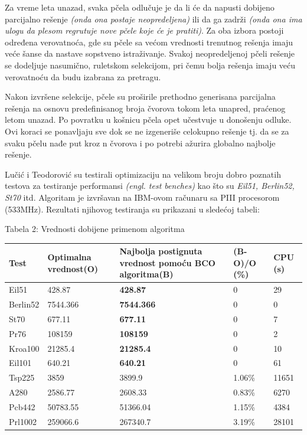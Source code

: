 \documentclass[a4paper]{article}
\begin{document}
{Za vreme leta unazad, svaka pčela odlučuje je da li će da napusti dobijeno parcijalno rešenje {\em{(onda ona postaje neopredeljena)}} ili da ga zadrži {\em{(onda ona ima ulogu da plesom regrutuje nove pčele koje će je pratiti)}}. Za oba izbora postoji određena verovatnoća, gde su pčele sa većom vrednosti trenutnog rešenja imaju veće šanse da nastave sopstveno istraživanje. Svakoj neopredeljenoj pčeli rešenje se dodeljuje nasumično, ruletskom selekcijom, pri čemu bolja rešenja imaju veću verovatnoću da budu izabrana za pretragu.

Nakon izvršene selekcije, pčele su proširile prethodno generisana parcijalna rešenja na osnovu predefinisanog broja čvorova tokom leta unapred, praćenog letom unazad. Po povratku u košnicu pčela opet učestvuje u donošenju odluke. Ovi koraci se ponavljaju sve dok se ne izgeneriše celokupno rešenje tj. da se za svaku pčelu nađe put kroz n čvorova i po potrebi ažurira globalno najbolje rešenje\cite{primena}.

Lučić i Teodorović su testirali optimizaciju na velikom broju dobro poznatih testova za testiranje performansi {\em (engl. test benches)} kao što su {\em Eil51, Berlin52, St70} itd\cite{test}. Algoritam je izvršavan na IBM-ovom računaru sa PIII procesorom (533MHz). Rezultati njihovog testiranja su prikazani u sledećoj tabeli: 

\begin{center}
Tabela 2: Vrednosti dobijene primenom algoritma \cite{test} 
\begin{tabular}{|p{1.2cm}|p{2cm}|p{2cm}|p{1.4cm}|p{1cm}|}
 \hline
Test & Optimalna vrednost(O) & Najbolja postignuta vrednost pomoću BCO algoritma(B)& (B-O)/O (\%) &CPU (s) \\ \hline
Eil51&428.87&{\textbf{428.87}}&0&29\\ \hline
Berlin52&7544.366&{\textbf{7544.366}}&0&0\\ \hline
St70&677.11&{\textbf{677.11}}&0&7\\ \hline
Pr76&108159&{\textbf{108159}}&0&2\\ \hline
Kroa100&21285.4&{\textbf{21285.4}}&0&10\\ \hline
Eil101&640.21&{\textbf{640.21}}&0&61\\ \hline
Tsp225&3859&3899.9&1.06\%&11651\\ \hline
A280&2586.77&2608.33&0.83\%&6270\\ \hline
Pcb442&50783.55&51366.04&1.15\%&4384\\ \hline
Prl1002&259066.6&267340.7&3.19\%&28101\\ \hline
\end{tabular}\par
\bigskip


\end{center}}
\end{document}
